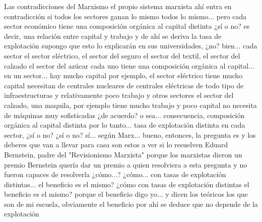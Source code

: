 Las contradicciones del Marxismo
el propio sistema marxista ahí entra en contradicción si todos los sectores ganan lo mismo
todos lo mismo... pero cada sector económico tiene una composición orgánica al capital distinta
¿sí o no? es decir, una relación entre capital y trabajo y de ahí se deriva
la tasa de explotación supongo que esto lo explicarán en sus universidades, ¿no? bien...
cada sector el sector eléctrico, el sector del seguro el sector del textil, el sector del calzado el sector del azúcar
cada uno tiene una composición orgánica al capital... en un sector...
hay mucho capital por ejemplo, el sector eléctrico tiene mucho capital necesitan de centrales nucleares de centrales eléctricas
de todo tipo de infraestructuras y relativamente poco trabajo y otros sectores el sector del calzado, una maquila, por ejemplo
tiene mucho trabajo y poco capital no necesita de máquinas muy sofisticadas ¿de acuerdo?
o sea... consecuencia, composición orgánica al capital distinta por lo tanto...
tasa de explotación distinta en cada sector, ¿sí o no? ¿sí o no? sí...
según Marx... bueno, entonces, la pregunta es y los deberes que van a llevar para casa son estos a ver si lo resuelven
Eduard Bernstein, padre del "Revisionismo Marxista"
porque los marxistas dieron un premio Bernstein quería dar un premio a quien resolviera a esta pregunta y no fueron capaces de resolverla ¿cómo...?
¿cómo... con tasas de explotación distintas... el beneficio es el mismo?
¿cómo con tasas de explotación distintas el beneficio es el mismo?
porque el beneficio digo yo... y dicen los teóricos los que son de mi escuela, obviamente
el beneficio por ahí se deduce que no depende de la explotación

